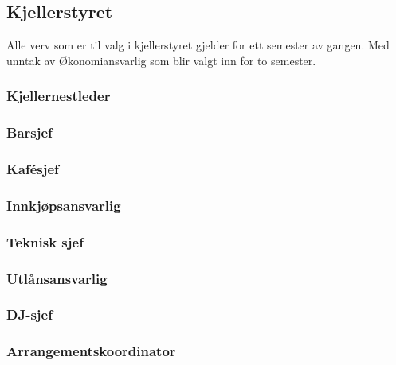 \documentclass[10pt,norsk,a4paper,usenames,dvipsnames]{article}
\begin{document}
\begin{minipage}[t]{0.5\textwidth}
    \subsection{Kjellerstyret} %
        Alle verv som er til valg i kjellerstyret gjelder for ett semester av gangen. Med unntak av Økonomiansvarlig som blir valgt inn for to semester.

        \subsubsection{Kjellernestleder}


        \subsubsection{Barsjef}


        \subsubsection{Kafésjef}




        \subsubsection{Innkjøpsansvarlig}


        \subsubsection{Teknisk sjef}


        \subsubsection{Utlånsansvarlig}


        \subsubsection{DJ-sjef}


        \subsubsection{Arrangementskoordinator}
\end{minipage}
\end{document}
